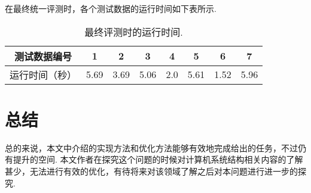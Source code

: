 \documentclass[10pt,letterpaper]{article}
\begin{document}
在最终统一评测时，各个测试数据的运行时间如下表所示.

\begin{table}[h!]
	\centering
\begin{tabular}{ |c||c|c|c|c|c|c|c|  }
	\hline
	测试数据编号&1&2&3&4&5&6&7\\
	\hline
	运行时间（秒）& 5.69 & 3.69 & 5.06 & 2.0 & 5.61 & 1.52 & 5.96 \\
	\hline
   \end{tabular}
   \caption{最终评测时的运行时间.}
   \label{table:2}
\end{table}

\section{总结}

总的来说，本文中介绍的实现方法和优化方法能够有效地完成给出的任务，不过仍有提升的空间. 本文作者在探究这个问题的时候对计算机系统结构相关内容的了解甚少，无法进行有效的优化，有待将来对该领域了解之后对本问题进行进一步的探究.
\end{document}
